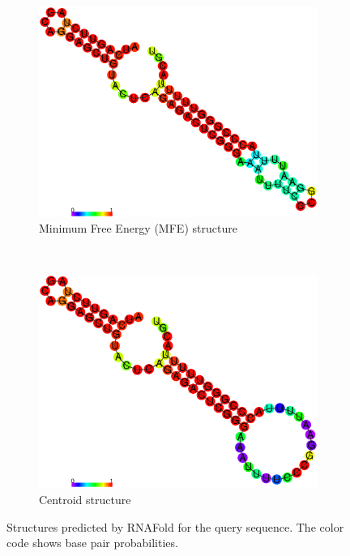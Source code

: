 \documentclass[10pt,a4paper]{article}
\begin{document}
\begin{figure}[!h]
    \centering
    \begin{subfigure}[b]{0.4\textwidth}
\includegraphics[width = \textwidth]{figures/sequence1_pp.eps}
        \caption{Minimum Free Energy (MFE) structure}
        \label{fig:MFE_1}
    \end{subfigure}
~
\begin{subfigure}[b]{0.4\textwidth}
\includegraphics[width = \textwidth]{figures/sequence1_centroid_pp}
        \caption{Centroid structure}
        \label{fig:CNT_1}
    \end{subfigure}
\caption{Structures predicted by RNAFold for the query sequence. The color code shows base pair probabilities.}
\end{figure}
\end{document}
